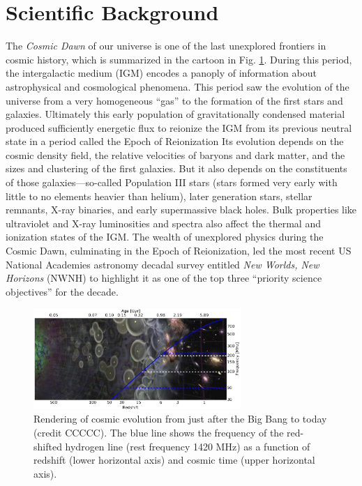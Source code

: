 \documentclass[preprint,11pt]{aastex}
\begin{document}
\section{Scientific Background}
\label{sec:science}

\noindent The {\it Cosmic Dawn} of our universe is one of the last unexplored
frontiers in cosmic history, which is summarized in the cartoon in Fig. \ref{fig:cosmos}. During this period, the 
intergalactic medium (IGM) encodes a panoply of information about astrophysical and cosmological phenomena. 
This period saw the evolution of the universe from a very homogeneous ``gas'' to the formation of the first stars and galaxies.
Ultimately this early population of gravitationally condensed material produced sufficiently energetic flux to reionize the IGM
from its previous neutral state in a period called the Epoch of Reionization
Its evolution depends on the cosmic density field, the relative velocities of
baryons and dark matter, and the sizes and clustering of the first galaxies.
But it also depends on the constituents of those galaxies---so-called Population
III stars (stars formed very early with little to no elements heavier than helium), later generation stars, stellar remnants, X-ray binaries,
and early supermassive black holes.  Bulk properties like
ultraviolet and X-ray luminosities and spectra also affect the thermal and
ionization states of the IGM.  The wealth of unexplored physics during the Cosmic Dawn,
culminating in the Epoch of Reionization, 
led the most recent US National Academies astronomy decadal survey entitled {\em New Worlds, New Horizons} (NWNH) to highlight it as one of the top three ``priority science objectives'' for
the decade.

\begin{figure}[h!]
	\centering
	\includegraphics[width=0.7\textwidth]{plots/cosmicEvo.png}
	\caption{Rendering of cosmic evolution from just after the Big Bang to today (credit CCCCC).  The blue line shows the frequency of the red-shifted hydrogen line (rest frequency 1420 MHz) as a function of redshift (lower horizontal axis) and cosmic time (upper horizontal axis).} 
	\label{fig:cosmos}
\end{figure}
\end{document}
